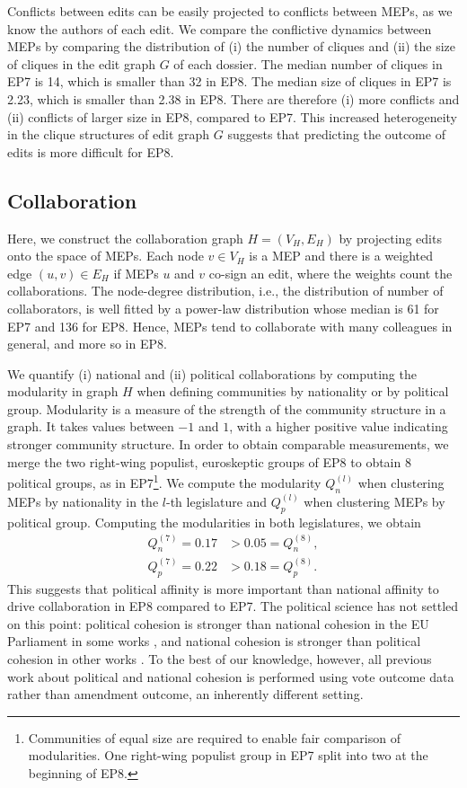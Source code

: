 Conflicts between edits can be easily projected to conflicts between MEPs, as we know the authors of each edit.
We compare the conflictive dynamics between MEPs by comparing the distribution of (i) the number of cliques and (ii) the size of cliques in the edit graph $G$ of each dossier.
The median number of cliques in EP7 is 14, which is smaller than 32 in EP8.
The median size of cliques in EP7 is 2.23, which is smaller than 2.38 in EP8.
There are therefore (i) more conflicts and (ii) conflicts of larger size in EP8, compared to EP7.
This increased heterogeneity in the clique structures of edit graph $G$ suggests that predicting the outcome of edits is more difficult for EP8.

\subsection{Collaboration}

Here, we construct the collaboration graph $ H = (V_H, E_H) $ by projecting edits onto the space of MEPs.
Each node $ v \in V_H $ is a MEP and there is a weighted edge $ (u, v) \in E_H $ if MEPs $u$ and $v$ co-sign an edit, where the weights count the collaborations.
The node-degree distribution, i.e., the distribution of number of collaborators, is well fitted by a power-law distribution whose median is 61 for EP7 and 136 for EP8.
Hence, MEPs tend to collaborate with many colleagues in general, and more so in EP8.

We quantify (i) national and (ii) political collaborations by computing the modularity \cite{newman2006modularity} in graph $H$ when defining communities by nationality or by political group.
Modularity is a measure of the strength of the community structure in a graph.
It takes values between $-1$ and $1$, with a higher positive value indicating stronger community structure.
In order to obtain comparable measurements, we merge the two right-wing populist, euroskeptic groups of EP8 to obtain 8 political groups, as in EP7\footnote{Communities of equal size are required to enable fair comparison of modularities. One right-wing populist group in EP7 split into two at the beginning of EP8.}.
We compute the modularity $ Q_n^{(l)} $ when clustering MEPs by nationality in the $l$-th legislature and $ Q_p^{(l)} $ when clustering MEPs by political group.
Computing the modularities in both legislatures, we obtain
\begin{align*}
  Q_n^{(7)} = 0.17  &>  0.05 = Q_n^{(8)}, \\
  Q_p^{(7)} = 0.22  &>  0.18 = Q_p^{(8)}.
\end{align*}
This suggests that political affinity is more important than national affinity to drive collaboration in EP8 compared to EP7.
The political science has not settled on this point: political cohesion is stronger than national cohesion in the EU Parliament in some works \cite{hix2002parliamentary,hix2008voting,mcelroy2010party}, and national cohesion is stronger than political cohesion in other works \cite{cicchi2013logic,hix2013empowerment,cencig2017voting}.
To the best of our knowledge, however, all previous work about political and national cohesion is performed using vote outcome data rather than amendment outcome, an inherently different setting.

